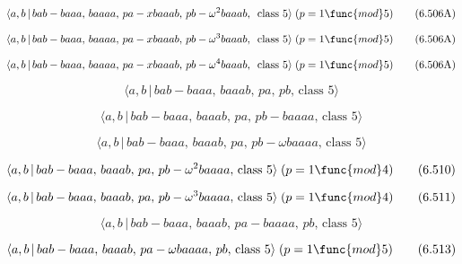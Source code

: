 \documentclass[10pt]{article}
\begin{document}
\begin{equation}
\langle a,b\,|\,bab-baaa,\,baaaa,\,pa-xbaaab,\,pb-\omega ^{2}baaab,\,\text{
class }5\rangle \;(p=1\func{mod}5)  \tag{6.506A}
\end{equation}

\begin{equation}
\langle a,b\,|\,bab-baaa,\,baaaa,\,pa-xbaaab,\,pb-\omega ^{3}baaab,\,\text{
class }5\rangle \;(p=1\func{mod}5)  \tag{6.506A}
\end{equation}

\begin{equation}
\langle a,b\,|\,bab-baaa,\,baaaa,\,pa-xbaaab,\,pb-\omega ^{4}baaab,\,\text{
class }5\rangle \;(p=1\func{mod}5)  \tag{6.506A}
\end{equation}

\begin{equation}
\langle a,b\,|\,bab-baaa,\,baaab,\,pa,\,pb,\,\text{class }5\rangle 
\tag{6.507}
\end{equation}

\begin{equation}
\langle a,b\,|\,bab-baaa,\,baaab,\,pa,\,pb-baaaa,\,\text{class }5\rangle 
\tag{6.508}
\end{equation}

\begin{equation}
\langle a,b\,|\,bab-baaa,\,baaab,\,pa,\,pb-\omega baaaa,\,\text{class }%
5\rangle  \tag{6.509}
\end{equation}

\begin{equation}
\langle a,b\,|\,bab-baaa,\,baaab,\,pa,\,pb-\omega ^2baaaa,\,\text{class }%
5\rangle\;(p=1 \func{mod} 4)  \tag{6.510}
\end{equation}

\begin{equation}
\langle a,b\,|\,bab-baaa,\,baaab,\,pa,\,pb-\omega ^3baaaa,\,\text{class }%
5\rangle\;(p=1 \func{mod} 4)  \tag{6.511}
\end{equation}

\begin{equation}
\langle a,b\,|\,bab-baaa,\,baaab,\,pa-baaaa,\,pb,\,\text{class }5\rangle 
\tag{6.512}
\end{equation}

\begin{equation}
\langle a,b\,|\,bab-baaa,\,baaab,\,pa-\omega baaaa,\,pb,\,\text{class }%
5\rangle\;(p=1 \func{mod} 5)  \tag{6.513}
\end{equation}
\end{document}
